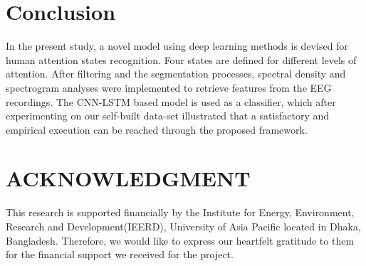 \documentclass[conference]{IEEEtran}
\begin{document}
\section{Conclusion}
In the present study, a novel model using deep learning methods is devised for human attention states recognition.  Four states are defined for different levels of attention.  After filtering and the segmentation processes, spectral density and spectrogram analyses were implemented to retrieve features from the EEG recordings. The CNN-LSTM based model is used as a classifier, which after experimenting on our self-built data-set illustrated that a satisfactory and empirical execution can be reached through the proposed framework.


\section*{ACKNOWLEDGMENT}
This research is supported financially by the Institute for Energy, Environment, Research and Development(IEERD), University of Asia Pacific located in Dhaka, Bangladesh. Therefore, we would like to express our heartfelt gratitude to them for the financial support we received for the project.
\end{document}
